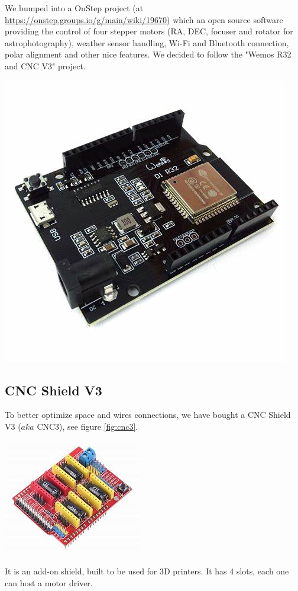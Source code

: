 \documentclass{article}
\begin{document}
\begin{multicols}{2}
        We bumped into a OnStep project (at \url{https://onstep.groups.io/g/main/wiki/19670}) which an open source software providing the control of four stepper motors (RA, DEC, focuser and rotator for astrophotography), weather sensor handling, Wi-Fi and Bluetooth connection, polar alignment and other nice features.
        We decided to follow the "Wemos R32 and CNC V3" project.
        
        \begin{minipage}
            {.5\textwidth}
            \centering
            \includegraphics[scale=0.28]{esp32_d1_r32.jpg}
            \label{fig:esp32}
        \end{minipage}

        \subsection{CNC Shield V3}
        To better optimize space and wires connections, we have bought a CNC Shield V3 (\(aka\) CNC3), see figure \ref{fig:cnc3}.
        \begin{minipage}
            {0.5\textwidth}
            \centering
            \includegraphics[scale=0.5]{CNC3.jpg}
            \label{fig:cnc3}
        \end{minipage}
        It is an add-on shield, built to be used for 3D printers.
        It has 4 slots, each one can host a motor driver.


\end{multicols}
\end{document}
